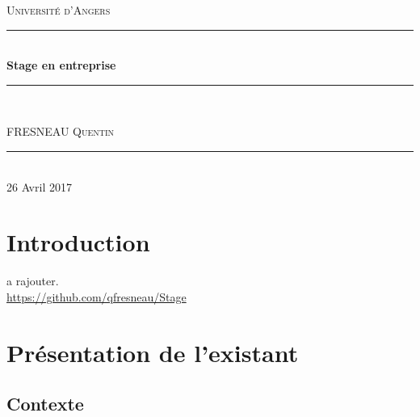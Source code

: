 \documentclass[a4paper,12pt]{extarticle}
\newcommand{\HRule}{\rule{\linewidth}{0.5mm}}
\begin{document}
\begin{titlepage}
  \begin{sffamily}
  \begin{center}


    \textsc{\LARGE Université d'Angers}\\[2cm]

   

    \HRule \\[0.4cm]
    { \huge \bfseries Stage en entreprise}{\bfseries  \\[0.4cm] }

    \HRule \\[2cm]
    

    \begin{minipage}{0.4\textwidth}
      \begin{flushleft} \large
        FRESNEAU \textsc{Quentin}
      \end{flushleft}
    \end{minipage}
    

    \vfill
    \HRule\\[2cm]
    {\large 26 Avril 2017}

  \end{center}
  \end{sffamily}
\end{titlepage}
\clearpage

\tableofcontents

\clearpage

\section{Introduction}

a rajouter.\\

\url{https://github.com/qfresneau/Stage}

\clearpage

\section{Présentation de l'existant}

\subsection{Contexte}
\end{document}

